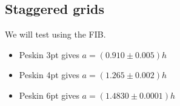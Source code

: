 \documentclass[ twoside,openright,titlepage,numbers=noenddot,%
headinclude,footinclude,cleardoublepage=empty,abstract=on,
BCOR=5mm,paper=a4,fontsize=11pt, dvipsnames
]{scrreprt}
\begin{document}
\subsection*{Staggered grids}
We will test using the \gls{FIB}.
\begin{itemize}
\item Peskin 3pt gives $a=(0.910\pm 0.005)h$
\item Peskin 4pt gives $a=(1.265\pm 0.002)h$
\item Peskin 6pt gives $a=(1.4830 \pm 0.0001 )h$
\end{itemize}
\begin{figure}
  \centering
  \label{fig:ibm_gauss3pt}
  \label{fig:ibm_peskin3pt}
  \label{fig:ibm_bm3pt}
  \label{fig:ibm_gauss10pt}

\end{figure}
\end{document}
